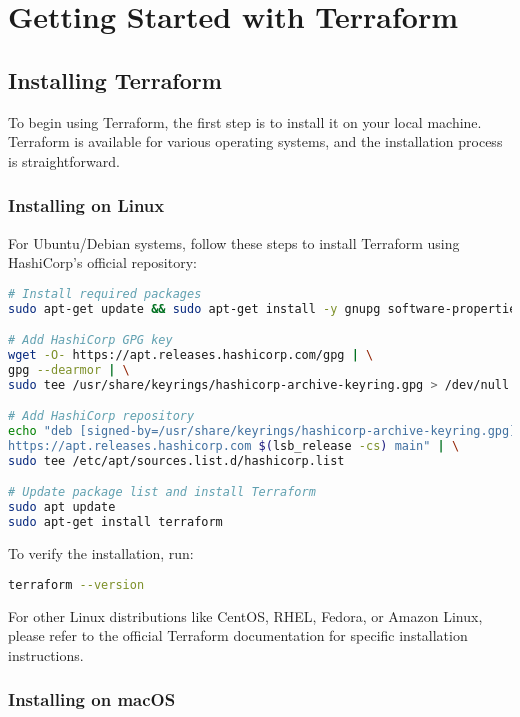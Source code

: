\chapter{Getting Started with Terraform}

\sloppy

\section{Installing Terraform}

To begin using Terraform, the first step is to install it on your local machine. Terraform is available for various operating systems, and the installation process is straightforward.

\subsection{Installing on Linux}

For Ubuntu/Debian systems, follow these steps to install Terraform using HashiCorp's official repository:

\begin{lstlisting}[language=bash]
# Install required packages
sudo apt-get update && sudo apt-get install -y gnupg software-properties-common

# Add HashiCorp GPG key
wget -O- https://apt.releases.hashicorp.com/gpg | \
gpg --dearmor | \
sudo tee /usr/share/keyrings/hashicorp-archive-keyring.gpg > /dev/null

# Add HashiCorp repository
echo "deb [signed-by=/usr/share/keyrings/hashicorp-archive-keyring.gpg] \
https://apt.releases.hashicorp.com $(lsb_release -cs) main" | \
sudo tee /etc/apt/sources.list.d/hashicorp.list

# Update package list and install Terraform
sudo apt update
sudo apt-get install terraform
\end{lstlisting}

To verify the installation, run:
\begin{lstlisting}[language=bash]
terraform --version
\end{lstlisting}

For other Linux distributions like CentOS, RHEL, Fedora, or Amazon Linux, please refer to the official Terraform documentation for specific installation instructions.

\subsection{Installing on macOS}

